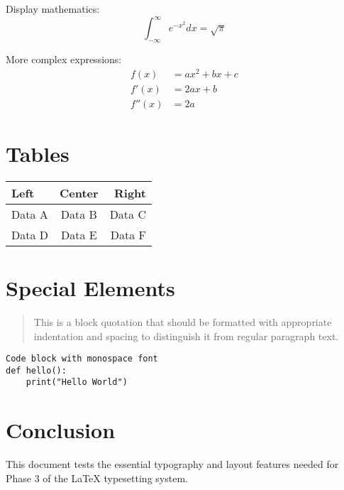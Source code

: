 \documentclass{article}
\begin{document}
Display mathematics:
\begin{equation}
\int_{-\infty}^{\infty} e^{-x^2} dx = \sqrt{\pi}
\end{equation}

More complex expressions:
\begin{align}
f(x) &= ax^2 + bx + c \\
f'(x) &= 2ax + b \\
f''(x) &= 2a
\end{align}

\section{Tables}

\begin{tabular}{|l|c|r|}
\hline
Left & Center & Right \\
\hline
Data A & Data B & Data C \\
Data D & Data E & Data F \\
\hline
\end{tabular}

\section{Special Elements}

\begin{quote}
This is a block quotation that should be formatted with appropriate indentation and spacing to distinguish it from regular paragraph text.
\end{quote}

\begin{verbatim}
Code block with monospace font
def hello():
    print("Hello World")
\end{verbatim}

\section{Conclusion}

This document tests the essential typography and layout features needed for Phase 3 of the LaTeX typesetting system.
\end{document}
